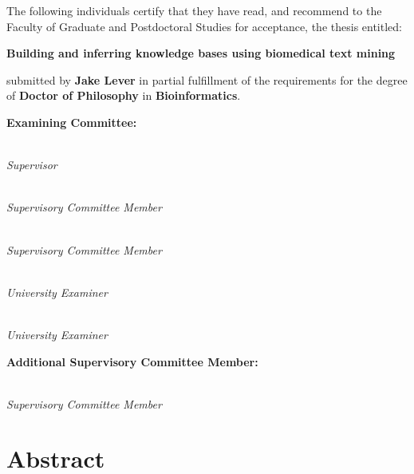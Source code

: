 
\noindent The following individuals certify that they have read,
and recommend to the Faculty of Graduate and Postdoctoral Studies
for acceptance, the thesis entitled:

\begin{center}
{\large \textbf{Building and inferring knowledge bases using biomedical text mining}}
\end{center}

submitted by \textbf{Jake Lever} in partial fulfillment of the requirements for the degree of \textbf{Doctor of Philosophy} in \textbf{Bioinformatics}.%
\par\bigskip%
\noindent\textbf{Examining Committee:}%
\par\medskip{}\\\emph{Supervisor}
\par\medskip{}\\\emph{Supervisory Committee Member}
\par\medskip{}\\\emph{Supervisory Committee Member}
\par\medskip{}\\\emph{University Examiner}
\par\medskip{}\\\emph{University Examiner}

\par\bigskip%
\noindent\textbf{Additional Supervisory Committee Member:}%
\par\medskip{}\\\emph{Supervisory Committee Member}
\cleardoublepage

\chapter{Abstract}


